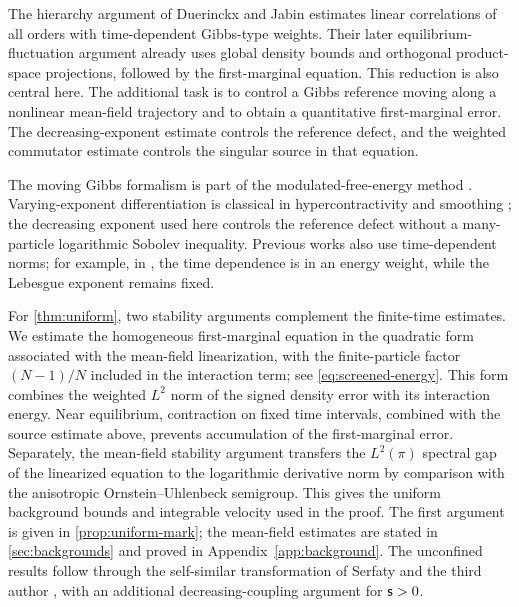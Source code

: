 \documentclass[11pt,reqno]{amsart}
\numberwithin{equation}{section}
\theoremstyle{plain}
\theoremstyle{remark}
\begin{document}
The hierarchy argument of Duerinckx and Jabin \cite[Sections~3--4]{DJBrownian} estimates linear correlations of all orders with time-dependent Gibbs-type weights. Their later equilibrium-fluctuation argument \cite[Sections~3--4]{DJFluctuations} already uses global density bounds and orthogonal product-space projections, followed by the first-marginal equation. This reduction is also central here. The additional task is to control a Gibbs reference moving along a nonlinear mean-field trajectory and to obtain a quantitative first-marginal error. The decreasing-exponent estimate controls the reference defect, and the weighted commutator estimate controls the singular source in that equation.



The moving Gibbs formalism is part of the modulated-free-energy method \cite{BJW,RSlsi}. Varying-exponent differentiation is classical in hypercontractivity and smoothing \cite{Gross,CarlenLoss}; the decreasing exponent used here controls the reference defect without a many-particle logarithmic Sobolev inequality. Previous works also use time-dependent norms; for example, in \cite{BJS}, the time dependence is in an energy weight, while the Lebesgue exponent remains fixed.



For \cref{thm:uniform}, two stability arguments complement the finite-time estimates. {We estimate the homogeneous first-marginal equation in the quadratic form associated with the mean-field linearization, with the finite-particle factor $(N-1)/N$ included in the interaction term; see \eqref{eq:screened-energy}.} This form combines the weighted $L^2$ norm of the signed density error with its interaction energy. Near equilibrium, contraction on fixed time intervals, combined with the source estimate above, prevents accumulation of the first-marginal error. Separately, the mean-field stability argument transfers the $L^2(\pi)$ spectral gap of the linearized equation to the logarithmic derivative norm by comparison with the anisotropic Ornstein--Uhlenbeck semigroup. This gives the uniform background bounds and integrable velocity used in the proof. The first argument is given in \cref{prop:uniform-mark}; the mean-field estimates are stated in \cref{sec:backgrounds} and proved in Appendix~\ref{app:background}. The unconfined results follow through the self-similar transformation of Serfaty and the third author \cite{RSselfsimilar}, with an additional decreasing-coupling argument for $\mathsf{s}>0$.
\end{document}

